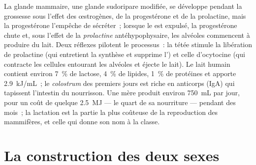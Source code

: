\begin{proposition}[La lactation]\label{prop:b2:mammal-reproduction:lactation}
La glande mammaire, une glande sudoripare modifiée, se développe pendant
la grossesse sous l'effet des œstrogènes, de la progestérone et de la
prolactine, mais la progestérone l'empêche de sécréter~; lorsque le
 est expulsé, la progestérone chute et, sous l'effet de la
\emph{prolactine} antéhypophysaire, les alvéoles commencent à produire
du lait. Deux réflexes pilotent le processus~: la tétée stimule la
libération de prolactine (qui entretient la synthèse et supprime
l') et celle d'ocytocine (qui contracte les cellules entourant
les alvéoles et éjecte le lait). Le lait humain contient environ
\qty{7}{\%} de lactose, \qty{4}{\%} de lipides, \qty{1}{\%} de protéines
et apporte \qty{2.9}{kJ/mL}~; le \emph{colostrum} des premiers jours est
riche en anticorps (IgA) qui tapissent l'intestin du nourrisson. Une
mère produit environ \qty{750}{mL} par jour, pour un coût de quelque
\qty{2.5}{MJ} --- le quart de sa nourriture --- pendant des mois~; la
lactation est la partie la plus coûteuse de la reproduction des
mammifères, et celle qui donne son nom à la classe.
\end{proposition}

\section{La construction des deux sexes}

